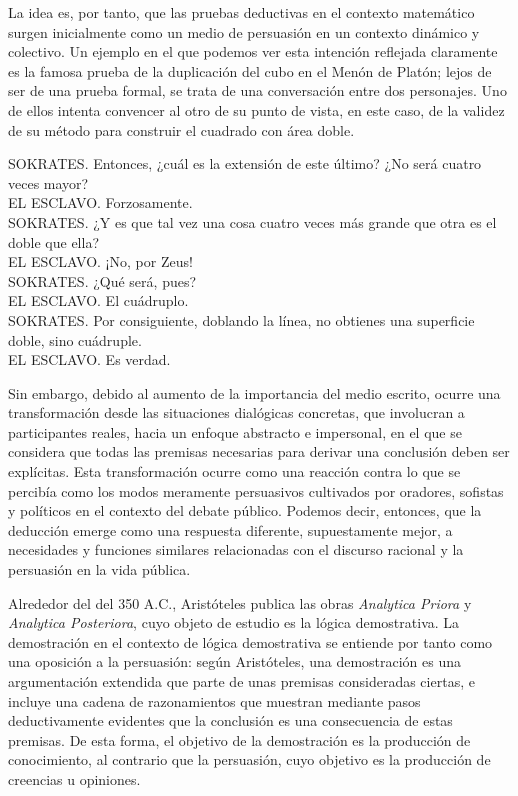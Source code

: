 \documentclass{article}
\begin{document}
La idea es, por tanto, que las pruebas deductivas en el contexto matemático surgen inicialmente como un medio de persuasión en un contexto dinámico y colectivo. Un ejemplo en el que podemos ver esta intención reflejada claramente es la famosa prueba de la duplicación del cubo en el Menón de Platón\cite{novaes2020dialogical}; lejos de ser de una prueba formal, se trata de una conversación entre dos personajes. Uno de ellos intenta convencer al otro de su punto de vista, en este caso, de la validez de su método para construir el cuadrado con área doble.

\begin{displayquote}
SOKRATES. Entonces, ¿cuál es la extensión de este último? ¿No será cuatro veces mayor?\\
EL ESCLAVO. Forzosamente.\\
SOKRATES. ¿Y es que tal vez una cosa cuatro veces más grande que otra es el doble que ella?\\
EL ESCLAVO. ¡No, por Zeus!\\
SOKRATES. ¿Qué será, pues?\\
EL ESCLAVO. El cuádruplo.\\
SOKRATES. Por consiguiente, doblando la línea, no obtienes una superficie doble, sino cuádruple.\\
EL ESCLAVO. Es verdad.\cite{bergua1958dialogos}
\end{displayquote}

Sin embargo, debido al aumento de la importancia del medio escrito, ocurre una transformación desde las situaciones dialógicas concretas, que involucran a participantes reales, hacia un enfoque abstracto e impersonal, en el que se considera que todas las premisas necesarias para derivar una conclusión deben ser explícitas. Esta transformación ocurre como una reacción contra lo que se percibía como los modos meramente persuasivos cultivados por oradores, sofistas y políticos en el contexto del debate público. Podemos decir, entonces, que la deducción emerge como una respuesta diferente, supuestamente mejor, a necesidades y funciones similares relacionadas con el discurso racional y la persuasión en la vida pública\cite{novaes2020dialogical}.

Alrededor del del 350 A.C., Aristóteles publica las obras \textit{Analytica Priora} y \textit{Analytica Posteriora}, cuyo objeto de estudio es la lógica demostrativa\cite{smith1989prior}. La demostración en el contexto de lógica demostrativa se entiende por tanto como una oposición a la persuasión: según Aristóteles, una demostración es una argumentación extendida que parte de unas premisas consideradas ciertas, e incluye una cadena de razonamientos que muestran mediante pasos deductivamente evidentes que la conclusión es una consecuencia de estas premisas. De esta forma, el objetivo de la demostración es la producción de conocimiento, al contrario que la persuasión, cuyo objetivo es la producción de creencias u opiniones\cite{corcoran2009aristotle}.
\end{document}
